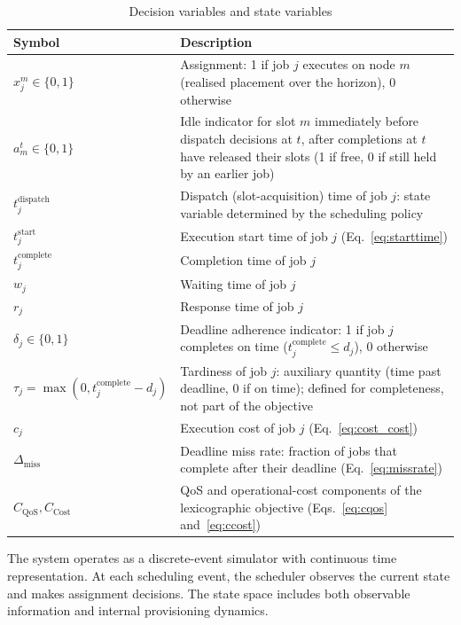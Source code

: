 \begin{table}[htbp]
\centering
\caption{Decision variables and state variables}
\label{tab:variables}
\begin{tabular}{lp{9cm}}
\toprule
\textbf{Symbol} & \textbf{Description} \\
\midrule
$x_j^m \in \{0,1\}$ & Assignment: 1 if job $j$ executes on node $m$ (realised placement over the horizon), 0 otherwise \\
$a_m^t \in \{0,1\}$ & Idle indicator for slot $m$ immediately before dispatch decisions at $t$, after completions at $t$ have released their slots (1 if free, 0 if still held by an earlier job) \\
$t_j^{\text{dispatch}}$ & Dispatch (slot-acquisition) time of job $j$: state variable determined by the scheduling policy \\
$t_j^{\text{start}}$ & Execution start time of job $j$ (Eq.~\ref{eq:starttime}) \\
$t_j^{\text{complete}}$ & Completion time of job $j$ \\
$w_j$ & Waiting time of job $j$ \\
$r_j$ & Response time of job $j$ \\
$\delta_j \in \{0,1\}$ & Deadline adherence indicator: 1 if job $j$ completes on time ($t_j^{\text{complete}} \leq d_j$), 0 otherwise \\
$\tau_j = \max(0, t_j^{\text{complete}} - d_j)$ & Tardiness of job $j$: auxiliary quantity (time past deadline, 0 if on time); defined for completeness, not part of the objective \\
$c_j$ & Execution cost of job $j$ (Eq.~\ref{eq:cost_cost}) \\
$\Delta_{\text{miss}}$ & Deadline miss rate: fraction of jobs that complete after their deadline (Eq.~\ref{eq:missrate}) \\
$C_{\text{QoS}}, C_{\text{Cost}}$ & QoS and operational-cost components of the lexicographic objective (Eqs.~\ref{eq:cqos} and~\ref{eq:ccost}) \\
\bottomrule
\end{tabular}
\end{table}

The system operates as a discrete-event simulator with continuous time representation. At each scheduling event, the scheduler observes the current state and makes assignment decisions. The state space includes both observable information and internal provisioning dynamics.

